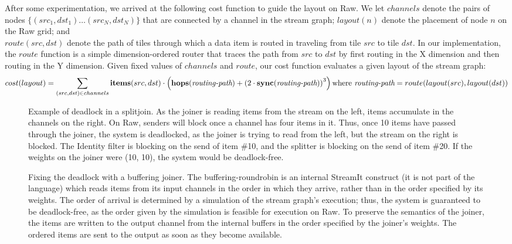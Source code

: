 After some experimentation, we arrived at the following cost function
to guide the layout on Raw.  We let $channels$ denote the pairs of
nodes $\{(src_1, dst_1) \dots (src_N, dst_N)\}$ that are connected by
a channel in the stream graph; $layout(n)$ denote the placement of
node $n$ on the Raw grid; and \\ $route(src, dst)$ denote the path of
tiles through which a data item is routed in traveling from tile $src$
to tile $dst$.  In our implementation, the $route$ function is a
simple dimension-ordered router that traces the path from $src$ to
$dst$ by first routing in the X dimension and then routing in the Y
dimension.  Given fixed values of $channels$ and $route$, our cost
function evaluates a given layout of the stream graph:
\begin{align*}
cost(layout) =  \sum_{(src,dst) \in channels}
 {\bf items}(src,dst)
\cdot  \left( {\bf hops}(\mbox{\it routing-path}) + 
  \left( 2 \cdot
{\bf sync}(\mbox{\it routing-path}) \right) ^{3} \right)  
\mbox{where } 
\mbox{\it routing-path} = route(layout(src), layout(dst))
\end{align*}

\begin{figure}
\centering
{}
\caption{\protect\small Example of deadlock in a splitjoin.  As the
joiner is reading items from the stream on the left, items accumulate
in the channels on the right.  On Raw, senders will block once a
channel has four items in it.  Thus, once 10 items have passed through
the joiner, the system is deadlocked, as the joiner is trying to read
from the left, but the stream on the right is blocked.  The Identity
filter is blocking on the send of item \#10, and the splitter is
blocking on the send of item \#20.  If the weights on the joiner were
(10, 10), the system would be deadlock-free.
\protect\label{fig:joiner-dead}}

\vspace{48pt}

\caption{\protect\small Fixing the deadlock with a buffering joiner.
The buffering-roundrobin is an internal StreamIt construct (it is not
part of the language) which reads items from its input channels in the
order in which they arrive, rather than in the order specified by its
weights.  The order of arrival is determined by a simulation of the
stream graph's execution; thus, the system is guaranteed to be
deadlock-free, as the order given by the simulation is feasible for
execution on Raw.  To preserve the semantics of the joiner, the items
are written to the output channel from the internal buffers in the
order specified by the joiner's weights.  The ordered items are sent
to the output as soon as they become available.
\protect\label{fig:joiner-live}}
\end{figure}


